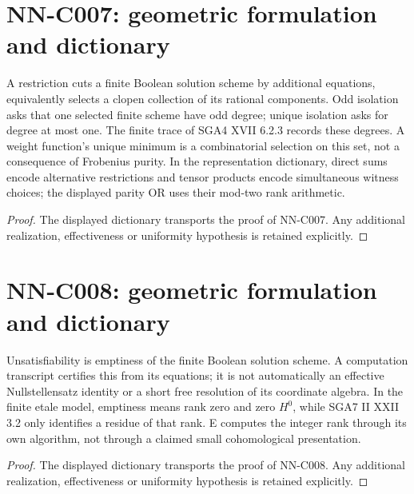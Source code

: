 \section{NN-C007: geometric formulation and dictionary}
\begin{geometricstatement}[NN-C007]
A restriction cuts a finite Boolean solution scheme by additional equations, equivalently selects a clopen collection of its rational components. Odd isolation asks that one selected finite scheme have odd degree; unique isolation asks for degree at most one. The finite trace of SGA4 XVII 6.2.3 records these degrees. A weight function's unique minimum is a combinatorial selection on this set, not a consequence of Frobenius purity. In the representation dictionary, direct sums encode alternative restrictions and tensor products encode simultaneous witness choices; the displayed parity OR uses their mod-two rank arithmetic.
\end{geometricstatement}
\begin{proof} The displayed dictionary transports the proof of NN-C007. Any additional realization, effectiveness or uniformity hypothesis is retained explicitly.\end{proof}


\section{NN-C008: geometric formulation and dictionary}
\begin{geometricstatement}[NN-C008]
Unsatisfiability is emptiness of the finite Boolean solution scheme. A computation transcript certifies this from its equations; it is not automatically an effective Nullstellensatz identity or a short free resolution of its coordinate algebra. In the finite etale model, emptiness means rank zero and zero $H^0$, while SGA7 II XXII 3.2 only identifies a residue of that rank. E computes the integer rank through its own algorithm, not through a claimed small cohomological presentation.
\end{geometricstatement}
\begin{proof} The displayed dictionary transports the proof of NN-C008. Any additional realization, effectiveness or uniformity hypothesis is retained explicitly.\end{proof}


